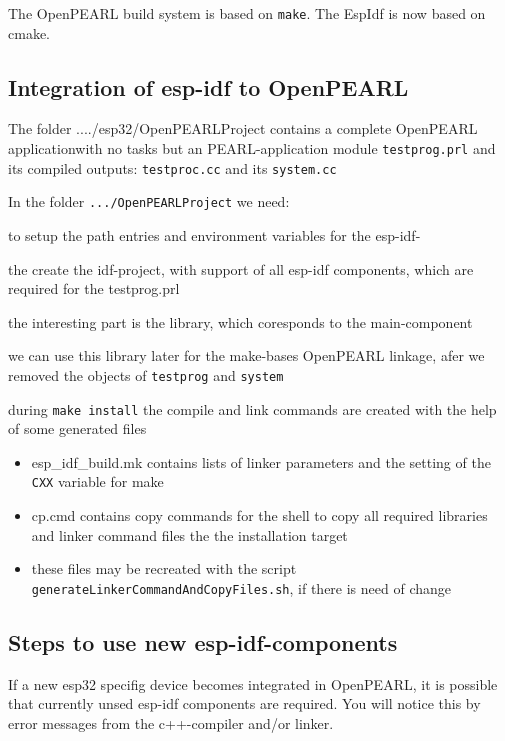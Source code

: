 The OpenPEARL build system is based on \verb|make|. The EspIdf is now based 
on cmake.

\subsection{Integration of esp-idf to OpenPEARL}
The folder ..../esp32/OpenPEARLProject contains a complete OpenPEARL applicationwith no tasks but an PEARL-application module \texttt{testprog.prl} 
and its compiled outputs: 
\texttt{testproc.cc} and its \texttt{system.cc}

In the folder \texttt{.../OpenPEARLProject} we need:
\begin{description}
\item[\texttt{. ~/esp/esp/idf/export.sh}] to setup the path entries and
   environment variables for the esp-idf-
\item [\texttt{idf.py build}] the create the idf-project, with support of all
   esp-idf components, which are required for the testprog.prl
\item the interesting part is the library, which coresponds 
   to the main-component
\item we can use this library later for the make-bases OpenPEARL linkage, afer
  we removed the objects of \texttt{testprog} and \texttt{system}
\item during \texttt{make install} the compile and link commands
  are created with the help of some generated files
  \begin{itemize}
  \item esp\_idf\_build.mk contains lists of linker parameters and the setting of  the \texttt{CXX} variable for make
  \item cp.cmd contains copy commands for the shell to copy all required
   libraries and linker command files the the installation target
  \item these files may be recreated with the script \texttt{generateLinkerCommandAndCopyFiles.sh}, if there is need of change
  \end{itemize}
\end{description}


\subsection{Steps to use new esp-idf-components}
If a new esp32 specifig device becomes integrated in OpenPEARL, it is
possible that currently unsed esp-idf components are required. 
You will notice this by error messages from the c++-compiler and/or linker.

